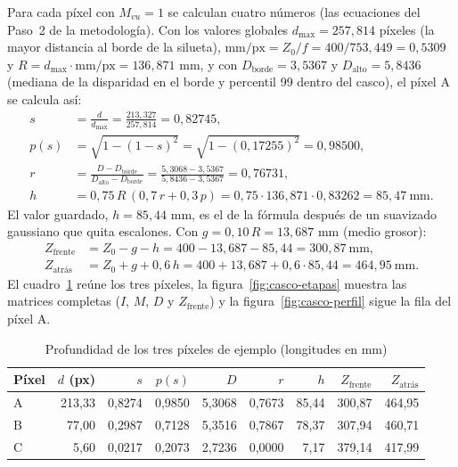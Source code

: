 Para cada píxel con $M_{vu}=1$ se calculan cuatro números (las ecuaciones del Paso~2 de la metodología). Con los
valores globales $d_{\max}=257{,}814$ píxeles (la mayor distancia al borde de la silueta),
$\text{mm/px}=Z_0/f=400/753{,}449=0{,}5309$ y $R=d_{\max}\cdot\text{mm/px}=136{,}871$ mm, y con
$D_{\text{borde}}=3{,}5367$ y $D_{\text{alto}}=5{,}8436$ (mediana de la disparidad en el borde y percentil 99 dentro del casco),
el píxel A se calcula así:
\begin{align*}
s&=\frac{d}{d_{\max}}=\frac{213{,}327}{257{,}814}=0{,}82745,\\
p(s)&=\sqrt{1-(1-s)^2}=\sqrt{1-(0{,}17255)^2}=0{,}98500,\\
r&=\frac{D-D_{\text{borde}}}{D_{\text{alto}}-D_{\text{borde}}}=\frac{5{,}3068-3{,}5367}{5{,}8436-3{,}5367}=0{,}76731,\\
h&=0{,}75\,R\,(0{,}7\,r+0{,}3\,p)=0{,}75\cdot136{,}871\cdot0{,}83262=85{,}47\ \text{mm}.
\end{align*}
El valor guardado, $h=85{,}44$ mm, es el de la fórmula después de un suavizado gaussiano que quita escalones. Con
$g=0{,}10\,R=13{,}687$ mm (medio grosor):
\begin{align*}
Z_{\text{frente}}&=Z_0-g-h=400-13{,}687-85{,}44=300{,}87\ \text{mm},\\
Z_{\text{atrás}}&=Z_0+g+0{,}6\,h=400+13{,}687+0{,}6\cdot85{,}44=464{,}95\ \text{mm}.
\end{align*}
El cuadro~\ref{tab:casco-prof} reúne los tres píxeles, la figura~\ref{fig:casco-etapas} muestra las matrices completas
($I$, $M$, $D$ y $Z_{\text{frente}}$) y la figura~\ref{fig:casco-perfil} sigue la fila del píxel A.

\begin{table}[htbp]
\caption{Profundidad de los tres píxeles de ejemplo (longitudes en mm)}
\label{tab:casco-prof}
\centering\small
\begin{tabular}{@{}lrrrrrrrr@{}}
\toprule
Píxel & $d$ (px) & $s$ & $p(s)$ & $D$ & $r$ & $h$ & $Z_{\text{frente}}$ & $Z_{\text{atrás}}$ \\
\midrule
A & 213{,}33 & 0{,}8274 & 0{,}9850 & 5{,}3068 & 0{,}7673 & 85{,}44 & 300{,}87 & 464{,}95 \\
B & 77{,}00 & 0{,}2987 & 0{,}7128 & 5{,}3516 & 0{,}7867 & 78{,}37 & 307{,}94 & 460{,}71 \\
C & 5{,}60 & 0{,}0217 & 0{,}2073 & 2{,}7236 & 0{,}0000 & 7{,}17 & 379{,}14 & 417{,}99 \\
\bottomrule
\end{tabular}
\end{table}

